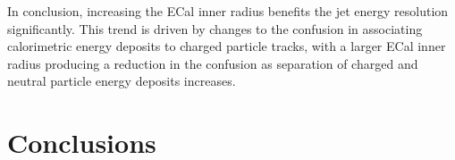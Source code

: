 In conclusion, increasing the ECal inner radius benefits the jet energy resolution significantly.  This trend is driven by changes to the confusion in associating calorimetric energy deposits to charged particle tracks, with a larger ECal inner radius producing a reduction in the confusion as separation of charged and neutral particle energy deposits increases.  


\section{Conclusions}



